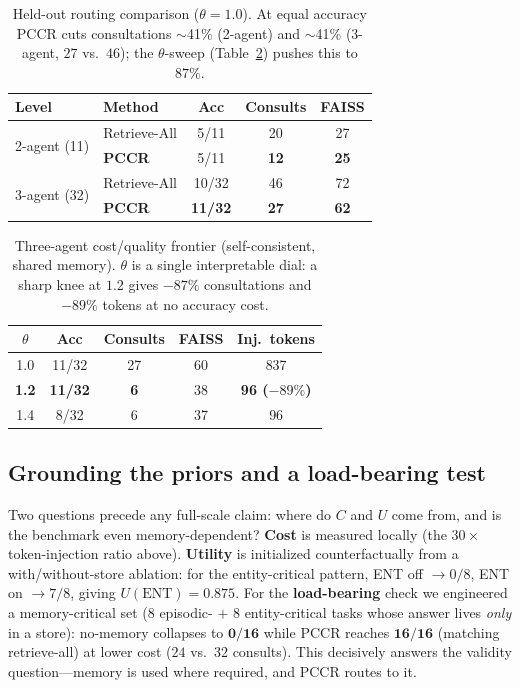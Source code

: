 \documentclass[10pt,twocolumn]{article}
\begin{document}
\begin{table}[t]
\centering\small
\setlength{\tabcolsep}{4pt}
\begin{tabular}{@{}llccc@{}}
\toprule
Level & Method & Acc & Consults & FAISS \\
\midrule
\multirow{2}{*}{2-agent (11)}
 & Retrieve-All & 5/11 & 20 & 27 \\
 & \textbf{PCCR} & 5/11 & \textbf{12} & \textbf{25} \\
\midrule
\multirow{2}{*}{3-agent (32)}
 & Retrieve-All & 10/32 & 46 & 72 \\
 & \textbf{PCCR} & \textbf{11/32} & \textbf{27} & \textbf{62} \\
\bottomrule
\end{tabular}
\caption{Held-out routing comparison ($\theta{=}1.0$). At equal accuracy PCCR cuts consultations
$\sim$41\% (2-agent) and $\sim$41\% (3-agent, $27$ vs.\ $46$); the $\theta$-sweep (Table~\ref{tab:frontier})
pushes this to $87\%$.}
\label{tab:cmp}
\end{table}

\begin{table}[t]
\centering\small
\begin{tabular}{@{}ccccc@{}}
\toprule
$\theta$ & Acc & Consults & FAISS & Inj.\ tokens \\
\midrule
1.0 & 11/32 & 27 & 60 & 837 \\
\textbf{1.2} & \textbf{11/32} & \textbf{6} & 38 & \textbf{96 ($-89\%$)} \\
1.4 & 8/32 & 6 & 37 & 96 \\
\bottomrule
\end{tabular}
\caption{Three-agent cost/quality frontier (self-consistent, shared memory). $\theta$ is a single
interpretable dial: a sharp knee at $1.2$ gives $-87\%$ consultations and $-89\%$ tokens at no
accuracy cost.}
\label{tab:frontier}
\end{table}

\subsection{Grounding the priors and a load-bearing test}\label{sec:grounding}
Two questions precede any full-scale claim: where do $C$ and $U$ come from, and is the benchmark even
memory-dependent? \textbf{Cost} is measured locally (the $30\times$ token-injection ratio above).
\textbf{Utility} is initialized counterfactually from a with/without-store ablation: for the
entity-critical pattern, ENT off $\to 0/8$, ENT on $\to 7/8$, giving $U(\text{ENT}){=}\mathbf{0.875}$.
For the \textbf{load-bearing} check we engineered a memory-critical set (8 episodic- $+$ 8
entity-critical tasks whose answer lives \emph{only} in a store): no-memory collapses to
$\mathbf{0/16}$ while PCCR reaches $\mathbf{16/16}$ (matching retrieve-all) at lower cost
($24$ vs.\ $32$ consults). This decisively answers the validity question---memory is used where
required, and PCCR routes to it.
\end{document}
